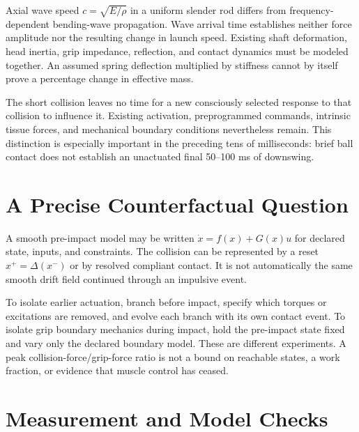 Axial wave speed $c=\sqrt{E/\rho}$ in a uniform slender rod differs from
frequency-dependent bending-wave propagation. Wave arrival time establishes
neither force amplitude nor the resulting change in launch speed. Existing
shaft deformation, head inertia, grip impedance, reflection, and contact
dynamics must be modeled together. An assumed spring deflection multiplied
by stiffness cannot by itself prove a percentage change in effective mass.

The short collision leaves no time for a new consciously selected response to
that collision to influence it. Existing activation, preprogrammed commands,
intrinsic tissue forces, and mechanical boundary conditions nevertheless remain.
This distinction is especially important in the preceding tens of milliseconds:
brief ball contact does not establish an unactuated final 50--100 ms of downswing.

\section{A Precise Counterfactual Question}
\label{sec:ztcf_impact}

A smooth pre-impact model may be written $\dot x=f(x)+G(x)u$ for declared
state, inputs, and constraints. The collision can be represented by a reset
$x^+=\Delta(x^-)$ or by resolved compliant contact. It is not automatically
the same smooth drift field continued through an impulsive event.

To isolate earlier actuation, branch before impact, specify which torques or
excitations are removed, and evolve each branch with its own contact event.
To isolate grip boundary mechanics during impact, hold the pre-impact state
fixed and vary only the declared boundary model. These are different
experiments. A peak collision-force/grip-force ratio is not a bound on
reachable states, a work fraction, or evidence that muscle control has ceased.

\section{Measurement and Model Checks}

